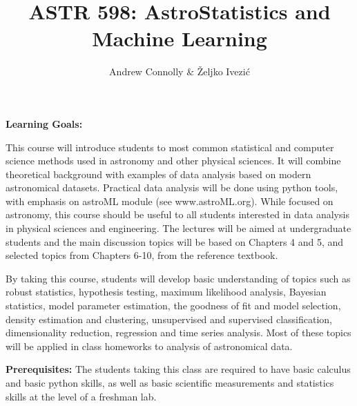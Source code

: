 \documentclass[10pt]{article}
\title{ASTR 598: AstroStatistics and Machine Learning}
\author{Andrew Connolly \& \v{Z}eljko Ivezi\'{c}}
\affil{University of Washington, Winter Quarter 2018}
\date{\vspace{-5ex}}
\begin{document}
\maketitle

\vskip 0.3in

\vskip 0.2in
\vskip 0.2in
\vskip 0.2in
\vskip 0.2in
\vskip 0.3in

{\bf Learning Goals:}

This course will introduce students to most common statistical and computer science methods 
used in astronomy and other physical sciences. It will combine theoretical background with 
examples of data analysis based on modern astronomical datasets. Practical data analysis 
will be done using python tools, with emphasis on astroML module (see www.astroML.org). 
While focused on astronomy, this course should be useful to all students interested in data 
analysis in physical sciences and engineering. The lectures will be aimed at undergraduate 
students and the main discussion topics will be based on  Chapters 4 and 5, and selected 
topics from Chapters 6-10, from the reference textbook. 

By taking this course, students will develop basic understanding of topics such as robust 
statistics, hypothesis testing, maximum likelihood analysis, Bayesian statistics, model 
parameter estimation, the goodness of fit and model selection, density estimation and 
clustering, unsupervised and supervised classification, dimensionality reduction, 
regression and time series analysis. Most of these topics will be applied in class homeworks 
to analysis of astronomical data. 

{\bf Prerequisites:}
The students taking this class are required to have basic calculus and basic python skills, 
as well as basic scientific measurements and statistics skills at the level of a freshman lab. 
\end{document}

